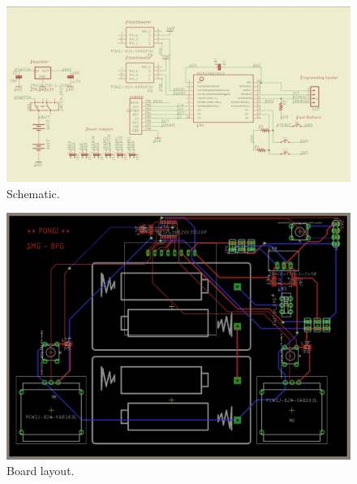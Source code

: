 \documentclass{article}
\begin{document}
\begin{figure}
    \includegraphics[height=0.6\textheight]{sch.png}
    \caption{Schematic.}
    \label{fig:PropProf}
\end{figure}

\begin{figure}
    \includegraphics[height=0.8\textheight]{brd.png}
    \caption{Board layout.}
    \label{fig:PropProf}
\end{figure}
\end{document}
